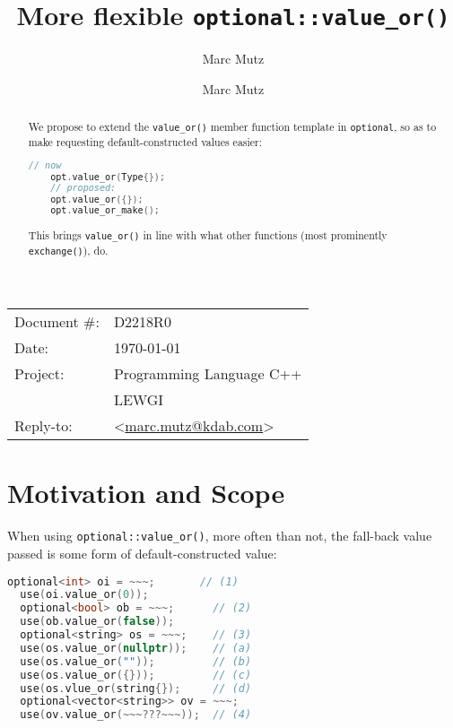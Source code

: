 \documentclass[11pt]{article}
\date{}
\title{More flexible \texttt{optional::value\_or()}}
\author{Marc Mutz}
\makeatletter
\newcommand{\emailaddress}{marc.mutz@kdab.com}
\newcommand{\email}{\href{mailto:\emailaddress}{\emailaddress}}
\makeatother
\begin{document}
\maketitle%

\begin{tabular}{ll}
  Document \#:&D2218R0\\
  Date:       &\today\\
  Project:    &Programming Language C++\\
              &LEWGI\\
  Reply-to:   &\author{Marc Mutz} \textless\email\textgreater
\end{tabular}
\vspace{1cm}
\begin{abstract}
  We propose to extend the \texttt{value\_or()} member function
  template in \texttt{optional}, so as to make requesting
  default-constructed values easier:
  \begin{lstlisting}[language=c++]
    // now
    opt.value_or(Type{});
    // proposed:
    opt.value_or({});
    opt.value_or_make();
  \end{lstlisting}
  This brings \texttt{value\_or()} in line with what other functions
  (most prominently \texttt{exchange()}), do.
\end{abstract}

\tableofcontents


\section{Motivation and Scope}

When using \texttt{optional::value\_or()}, more often than not, the
fall-back value passed is some form of default-constructed value:

\begin{lstlisting}[language=c++]
  optional<int> oi = ~~~;       // (1)
  use(oi.value_or(0));
  optional<bool> ob = ~~~;      // (2)
  use(ob.value_or(false));
  optional<string> os = ~~~;    // (3)
  use(os.value_or(nullptr));    // (a)
  use(os.value_or(""));         // (b)
  use(os.value_or({}));         // (c)
  use(os.vlue_or(string{});     // (d)
  optional<vector<string>> ov = ~~~;
  use(ov.value_or(~~~???~~~));  // (4)
\end{lstlisting}
\end{document}
